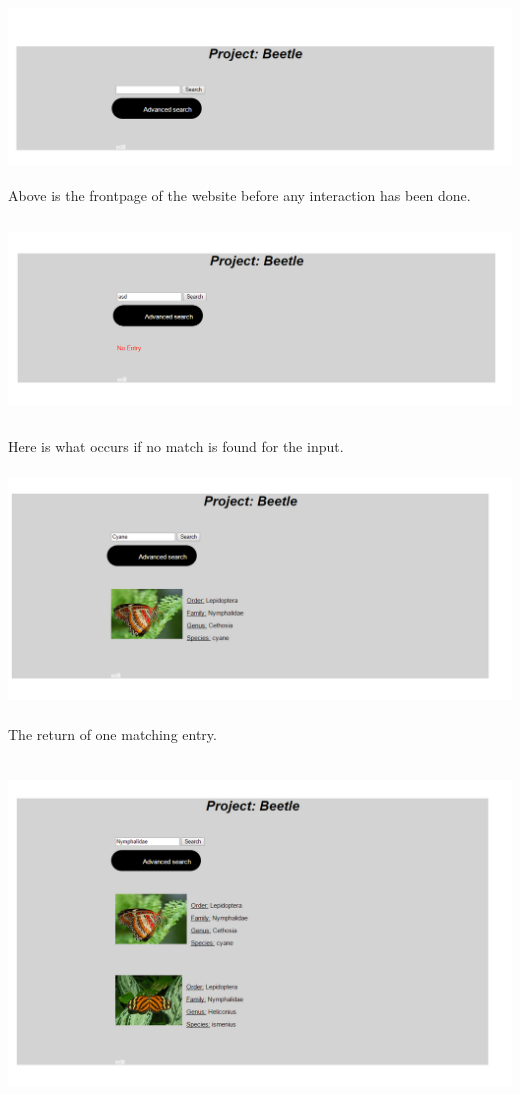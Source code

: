 \documentclass[12pt,a4paper]{article}
\begin{document}
\includegraphics[height=50mm]{Prototype1.png}\\
Above is the frontpage of the website before any interaction has been done.\\
\includegraphics[height=60mm]{Prototype2.png}\\
Here is what occurs if no match is found for the input.\\
\includegraphics[height=70mm]{Prototype3.png}\\
The return of one matching entry.\\
\includegraphics[height=100mm]{Prototype4.png}\\
\end{document}
